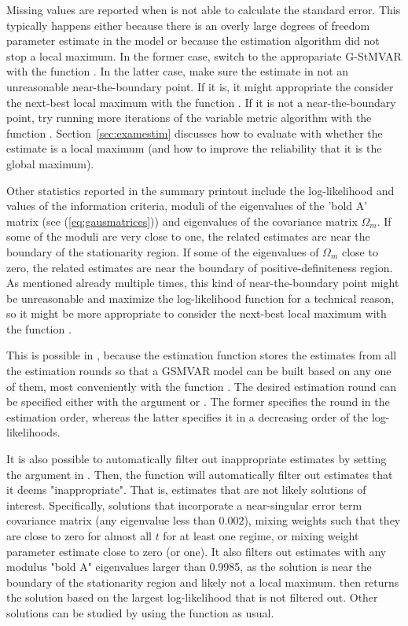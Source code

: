\documentclass[nojss]{jss}
\begin{document}
Missing values are reported when  is not able to calculate the standard error. This typically happens either because there is an overly large degrees of freedom parameter estimate in the model or because the estimation algorithm did not stop a local maximum. In the former case, switch to the appropariate G-StMVAR with the function . In the latter case, make sure the estimate in not an unreasonable near-the-boundary point. If it is, it might appropriate the consider the next-best local maximum with the function . If it is not a near-the-boundary point, try running more iterations of the variable metric algorithm with the function . Section~\ref{sec:examestim} discusses how to evaluate with  whether the estimate is a local maximum (and how to improve the reliability that it is the global maximum).

Other statistics reported in the summary printout include the log-likelihood and values of the information criteria, moduli of the eigenvalues of the 'bold A' matrix (see (\ref{eq:gausmatrices})) and eigenvalues of the covariance matrix $\Omega_m$. If some of the moduli are very close to one, the related estimates are near the boundary of the stationarity region. If some of the eigenvalues of $\Omega_m$ close to zero, the related estimates are near the boundary of positive-definiteness region. As mentioned already multiple times, this kind of near-the-boundary point might be unreasonable and maximize the log-likelihood function for a technical reason, so it might be more appropriate to consider the next-best local maximum with the function .

This is possible in , because the estimation function  stores the estimates from all the estimation rounds so that a GSMVAR model can be built based on any one of them, most conveniently with the function . The desired estimation round can be specified either with the argument  or . The former specifies the round in the estimation order, whereas the latter specifies it in a decreasing order of the log-likelihoods.

It is also possible to automatically filter out inappropriate estimates by setting the argument  in . Then, the function will automatically filter out estimates that it deems "inappropriate". That is, estimates that are not likely solutions of interest. Specifically, solutions that incorporate a near-singular error term covariance matrix (any eigenvalue less than $0.002$), mixing weights such that they are close to zero for almost all $t$ for at least one regime, or mixing weight parameter estimate close to zero (or one). It also filters out estimates with any modulus "bold A" eigenvalues larger than 0.9985, as the solution is near the boundary of the stationarity region and likely not a local maximum.  then returns the solution based on the largest log-likelihood that is not filtered out. Other solutions can be studied by using the function  as usual.
\end{document}
